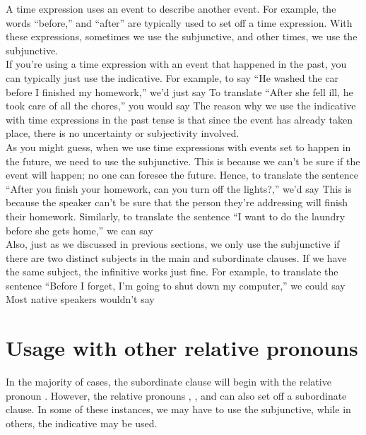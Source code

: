 A time expression uses an event to describe another event. For example, the words ``before,'' and ``after'' are typically used to set off a time expression. With these expressions, sometimes we use the subjunctive, and other times, we use the subjunctive. \\

	If you're using a time expression with an event that happened in the past, you can typically just use the indicative. For example, to say ``He washed the car before I finished my homework,'' we'd just say  To translate ``After she fell ill, he took care of all the chores,'' you would say  The reason why we use the indicative with time expressions in the past tense is that since the event has already taken place, there is no uncertainty or subjectivity involved. \\

As you might guess, when we use time expressions with events set to happen in the future, we need to use the subjunctive. This is because we can't be sure if the event will happen; no one can foresee the future. Hence, to translate the sentence ``After you finish your homework, can you turn off the lights?,'' we'd say  This is because the speaker can't be sure that the person they're addressing will finish their homework. Similarly, to translate the sentence ``I want to do the laundry before she gets home,'' we can say  \\

Also, just as we discussed in previous sections, we only use the subjunctive if there are two distinct subjects in the main and subordinate clauses. If we have the same subject, the infinitive works just fine. For example, to translate the sentence ``Before I forget, I'm going to shut down my computer,'' we could say  Most native speakers wouldn't say  \\

\section{Usage with other relative pronouns}
\label{sec:relpro}
In the majority of cases, the subordinate clause will begin with the relative pronoun . However, the relative pronouns , , and  can also set off a subordinate clause. In some of these instances, we may have to use the subjunctive, while in others, the indicative may be used. \\


